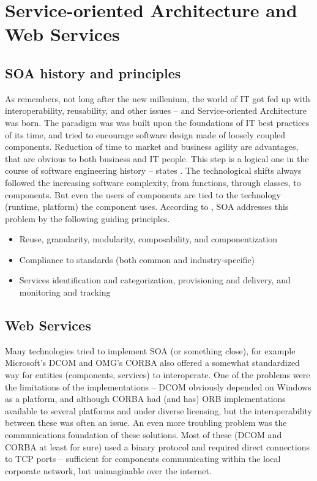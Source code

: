 \chapter{Service-oriented Architecture and Web Services}

\section{SOA history and principles}

As \cite{soa_modeling} remembers, not long after the new millenium, the world of IT got fed up with interoperability, reusability, and other issues -- and Service-oriented Architecture was born. The paradigm was was built upon the foundations of IT best practices of its time, and tried to encourage software design made of loosely coupled components. Reduction of time to market and business agility are advantages, that are obvious to both business and IT people. This step is a logical one in the course of software engineering history -- states \cite{devcom_soa_intro}. The technological shifts always followed the increasing software complexity, from functions, through classes, to components. But even the users of components are tied to the technology (runtime, platform) the component uses. According to \cite{ibm_soa_impro}, SOA addresses this problem by the following guiding principles.

\begin{itemize}
 \item Reuse, granularity, modularity, composability, and componentization
 \item Compliance to standards (both common and industry-specific)
 \item Services identification and categorization, provisioning and delivery, and monitoring and tracking
\end{itemize}

\section{Web Services}

Many technologies tried to implement SOA (or something close), for example Microsoft's DCOM and OMG's CORBA also offered a somewhat standardized way for entities (components, services) to interoperate. One of the problems were the limitations of the implementations -- DCOM obviously depended on Windows as a platform, and although CORBA had (and has) ORB implementations available to several platforms and under diverse licensing, but the interoperability between these was often an issue. An even more troubling problem was the communications foundation of these solutions. Most of these (DCOM and CORBA at least for sure) used a binary protocol and required direct connections to TCP ports -- sufficient for components communicating within the local corporate network, but unimaginable over the internet.

